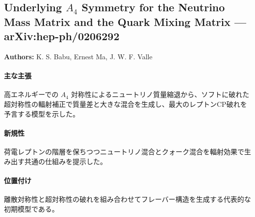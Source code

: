 \subsection{Underlying $A_4$ Symmetry for the Neutrino Mass Matrix and the Quark Mixing Matrix --- arXiv:hep-ph/0206292}

\textbf{Authors:} K. S. Babu, Ernest Ma, J. W. F. Valle

\paragraph{主な主張}
高エネルギーでの $A_4$ 対称性によるニュートリノ質量縮退から、ソフトに破れた超対称性の輻射補正で質量差と大きな混合を生成し、最大のレプトンCP破れを予言する模型を示した\cite{Babu:2002dz}。

\paragraph{新規性}
荷電レプトンの階層を保ちつつニュートリノ混合とクォーク混合を輻射効果で生み出す共通の仕組みを提示した。

\paragraph{位置付け}
離散対称性と超対称性の破れを組み合わせてフレーバー構造を生成する代表的な初期模型である。
